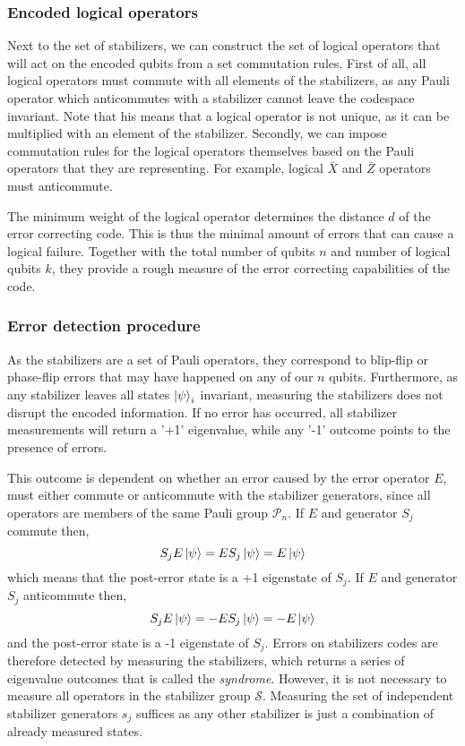 \subsubsection{Encoded logical operators}

Next to the set of stabilizers, we can construct the set of logical operators that will act on the encoded qubits from a set commutation rules. First of all, all logical operators must commute with all elements of the stabilizers, as any Pauli operator which anticommutes with a stabilizer cannot leave the codespace invariant. Note that his means that a logical operator is not unique, as it can be multiplied with an element of the stabilizer. Secondly, we can impose commutation rules for the logical operators themselves based on the Pauli operators that they are representing. For example, logical $\bar{X}$ and $\bar{Z}$ operators must anticommute.

The minimum weight of the logical operator determines the distance $d$ of the error correcting code. This is thus the minimal amount of errors that can cause a logical failure. Together with the total number of qubits $n$ and number of logical qubits $k$, they provide a rough measure of the error correcting capabilities of the code. 

\subsubsection{Error detection procedure}

As the stabilizers are a set of Pauli operators, they correspond to blip-flip or phase-flip errors that may have happened on any of our $n$ qubits. Furthermore, as any stabilizer leaves all states  $\ket{\psi}_i$ invariant, measuring the stabilizers does not disrupt the encoded information. If no error has occurred, all stabilizer measurements will return a '+1' eigenvalue, while any '-1' outcome points to the presence of errors. 

This outcome is dependent on whether an error caused by the error operator $E$, must either commute or anticommute with the stabilizer generators, since all operators are members of the same Pauli group $\mathcal{P}_n$. If $E$ and generator $S_j$ commute then,
\begin{equation}
  S_jE\ket{\psi} = ES_j\ket{\psi} = E\ket{\psi}
\end{equation}
which means that the post-error state is a +1 eigenstate of $S_j$. If $E$ and generator $S_j$ anticommute then,
\begin{equation}
  S_jE\ket{\psi} = -ES_j\ket{\psi} = -E\ket{\psi}
\end{equation}
and the post-error state is a -1 eigenstate of $S_j$. Errors on stabilizers codes are therefore detected by measuring the stabilizers, which returns a series of eigenvalue outcomes that is called the \emph{syndrome}. However, it is not necessary to measure all operators in the stabilizer group $\mathcal{S}$. Measuring the set of independent stabilizer generators $s_j$ suffices as any other stabilizer is just a combination of already measured states.

